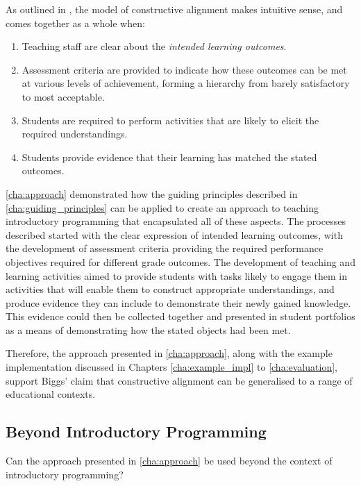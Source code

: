 As outlined in \cite{Biggs:1996c}, the model of constructive alignment makes intuitive sense, and comes together as a whole when:
\begin{enumerate}
	\item Teaching staff are clear about the \emph{intended learning outcomes}.
	\item Assessment criteria are provided to indicate how these outcomes can be met at various levels of achievement, forming a hierarchy from barely satisfactory to most acceptable.
	\item Students are required to perform activities that are likely to elicit the required understandings.
	\item Students provide evidence that their learning has matched the stated outcomes.
\end{enumerate}

\cref{cha:approach} demonstrated how the guiding principles described in \cref{cha:guiding_principles} can be applied to create an approach to teaching introductory programming that encapsulated all of these aspects. The processes described started with the clear expression of intended learning outcomes, with the development of assessment criteria providing the required performance objectives required for different grade outcomes. The development of teaching and learning activities aimed to provide students with tasks likely to engage them in activities that will enable them to construct appropriate understandings, and produce evidence they can include to demonstrate their newly gained knowledge. This evidence could then be collected together and presented in student portfolios as a means of demonstrating how the stated objects had been met.

Therefore, the approach presented in \cref{cha:approach}, along with the example implementation discussed in Chapters \ref{cha:example_impl} to \ref{cha:evaluation}, support Biggs' claim that constructive alignment can be generalised to a range of educational contexts. 


\subsection{Beyond Introductory Programming} %
\label{sub:beyond_introductory_programming}

Can the approach presented in \cref{cha:approach} be used beyond the context of introductory programming?



